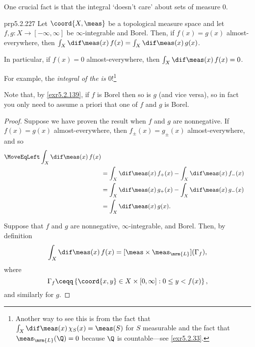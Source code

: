 One crucial fact is that the integral `doesn't care' about sets of measure $0$.
\begin{prp}{}{prp5.2.227}
Let $\coord{X,\meas}$ be a topological measure space and let $f,g\colon X\rightarrow [-\infty ,\infty ]$ be $\infty$-integrable and Borel.  Then, if $f(x)=g(x)$ almost-everywhere, then $\int _X\dif \meas (x)\, f(x)=\int _X\dif \meas (x)\, g(x)$.
\begin{rmk}
In particular, if $f(x)=0$ almost-everywhere, then $\int _X\dif \meas (x)\, f(x)=0$.
\end{rmk}
\begin{rmk}
For example, the \emph{integral of the  is $0$}!\footnote{Another way to see this is from the fact that $\int _X\dif \meas (x)\, \chi _S(x)=\meas (S)$ for $S$ measurable and the fact that $\meas _{\mrm{L}}(\Q )=0$ because $\Q$ is countable---see \cref{exr5.2.33}.}
\end{rmk}
\begin{rmk}
Note that, by \cref{exr5.2.139}, if $f$ is Borel then so is $g$ (and vice versa), so in fact you only need to assume a priori that one of $f$ and $g$ is Borel.
\end{rmk}
\begin{proof}
Suppose we have proven the result when $f$ and $g$ are nonnegative.  If $f(x)=g(x)$ almost-everywhere, then $f_{\pm}(x)=g_{\pm}(x)$ almost-everywhere, and so
\begin{equation}
\begin{split}
\MoveEqLeft
\int _X\dif \meas (x)\, f(x) \\
& =\int _X\dif \meas (x)\, f_+(x)-\int _X\dif \meas (x)\, f_-(x) \\
& =\int _X\dif \meas (x)\, g_+(x)-\int _X\dif \meas (x)\, g_-(x) \\
& =\int _X\dif \meas (x)\, g(x).
\end{split}
\end{equation}

Suppose that $f$ and $g$ are nonnegative, $\infty$-integrable, and Borel.  Then, by definition
\begin{equation}
\int _X\dif \meas (x)\, f(x)=[\meas \times \meas _{\mrm{L}}](\Gamma _f),
\end{equation}
where
\begin{equation}
\Gamma _f\ceqq \left\{ \coord{x,y}\in X\times [0,\infty ]:0\leq y<f(x)\right\} ,
\end{equation}
and similarly for $g$.


\end{proof}
\end{prp}
